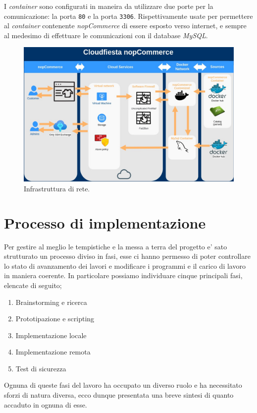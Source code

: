 \documentclass[a4paper]{report}
\begin{document}
		I \emph{container} sono configurati in maneira da utilizzare due porte per la comunicazione: la porta
		\texttt{80} e la porta \texttt{3306}. Rispettivamente usate per permettere al \emph{container} contenente
		\emph{nopCommerce} di essere esposto verso internet, e sempre al medesimo di effettuare le comunicazioni con il
		database \emph{MySQL}.

		\begin{figure}[H]
			\includegraphics[scale=0.3]{DiagrammaDiRete.jpg}
			\caption{Infrastruttura di rete.}\label{fig:architettura_di_rete}
		\end{figure}
 

\chapter{Processo di implementazione}\label{processo_di_implementazione}
	Per gestire al meglio le tempistiche e la messa a terra del progetto e' sato strutturato un processo diviso in fasi,
	esse ci hanno permesso di poter controllare lo stato di avanzamento dei lavori e modificare i programmi e il carico
	di lavoro in maniera coerente. In particolare possiamo individuare cinque principali fasi, elencate di seguito;
	\begin{enumerate}
		\item Brainstorming e ricerca
		\item Prototipazione e scripting
		\item Implementazione locale
		\item Implementazione remota
		\item Test di sicurezza
	\end{enumerate}
	Ognuna di queste fasi del lavoro ha occupato un diverso ruolo e ha necessitato sforzi di natura diversa, ecco dunque
	presentata una breve sintesi di quanto accaduto in ognuna di esse.
\end{document}
